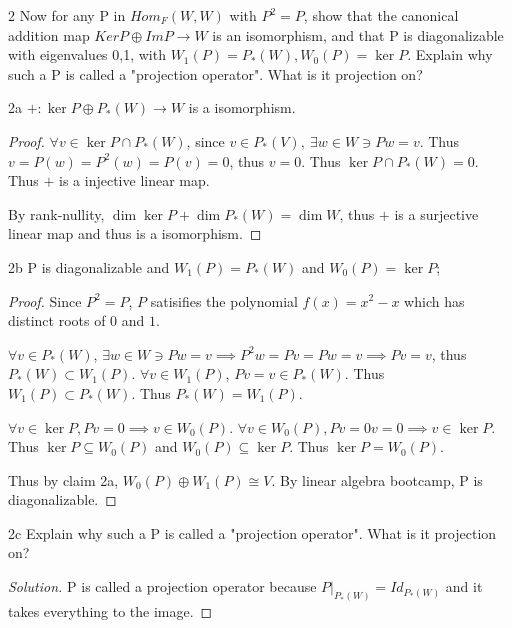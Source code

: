 \documentclass{article}
\newenvironment{solution}
{\renewcommand\qedsymbol{$\blacksquare$}\begin{proof}[Solution]}
{\end{proof}}
\begin{document}
\begin{PROB}{2}\label{Problem 2.}
    Now for any P in $Hom_F(W,W)$ with $P^2 = P$, show that the canonical addition map $Ker P \oplus Im P \to W$ is an isomorphism, and that P is diagonalizable with eigenvalues 0,1, with $W_1(P) = P_*(W), W_0(P) = \ker P$.  Explain why such a P is called a "projection operator". What is it projection on?
\end{PROB}
\begin{claim}{2a}\label{Claim 2a.}
    $+ : \ker P \oplus P_*(W) \to W$ is a isomorphism.
\end{claim}
\begin{proof}
    $\forall v \in \ker P \cap P_*(W)$, since $v \in P_*(V),~ \exists w \in W \ni Pw = v$. Thus $v = P(w) = P^2(w) = P(v) = 0$, thus $v = 0$. Thus $\ker P \cap P_*(W) = 0$. Thus $+$ is a injective linear map. 
    
    By rank-nullity, $\dim \ker P + \dim P_*(W) = \dim W$, thus $+$ is a surjective linear map and thus is a isomorphism.  
\end{proof}
\begin{claim}{2b}\label{Claim 2b.}
    P is diagonalizable and $W_1(P) = P_*(W)$ and $W_0(P)= \ker P$;  
\end{claim}
\begin{proof}
    Since $P^2 = P$, $P$ satisifies the polynomial $f(x) = x^2 - x$ which has distinct roots of $0$ and $1$. 
    
    $\forall v \in P_*(W)$, $\exists w \in W \ni Pw = v \implies P^2 w = Pv = Pw = v \implies Pv = v$, thus $P_*(W) \subset W_1(P)$. $\forall v \in W_1(P)$, $Pv = v \in P_*(W)$. Thus $W_1(P) \subset P_*(W)$. Thus $P_*(W) = W_1(P)$.
    
    $\forall v \in \ker P, Pv = 0 \implies v\in W_0(P)$. $\forall v \in W_0(P), Pv = 0v = 0 \implies v\in \ker P$. Thus $\ker P \subseteq W_0(P)$ and $W_0(P) \subseteq \ker P$. Thus $\ker P = W_0(P)$. 
    
    
    Thus by claim 2a, $W_0(P) \oplus W_1(P) \cong V$. By linear algebra bootcamp, P is diagonalizable. 
\end{proof}
\begin{PROB}{2c}\label{Problem 2c.}
    Explain why such a P is called a "projection operator". What is it projection on?
\end{PROB}
\begin{solution}
    P is called a projection operator because $P|_{P_*(W)} = Id_{P_*(W)}$ and it takes everything to the image.    
\end{solution}
\end{document}
